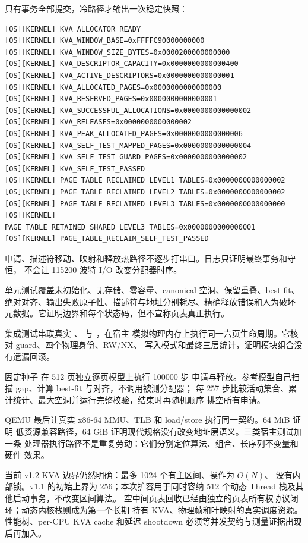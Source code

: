 只有事务全部提交，冷路径才输出一次稳定快照：

\begin{verbatim}
[OS][KERNEL] KVA_ALLOCATOR_READY
[OS][KERNEL] KVA_WINDOW_BASE=0xFFFFC90000000000
[OS][KERNEL] KVA_WINDOW_SIZE_BYTES=0x0000200000000000
[OS][KERNEL] KVA_DESCRIPTOR_CAPACITY=0x0000000000000400
[OS][KERNEL] KVA_ACTIVE_DESCRIPTORS=0x0000000000000001
[OS][KERNEL] KVA_ALLOCATED_PAGES=0x0000000000000000
[OS][KERNEL] KVA_RESERVED_PAGES=0x0000000000000001
[OS][KERNEL] KVA_SUCCESSFUL_ALLOCATIONS=0x0000000000000002
[OS][KERNEL] KVA_RELEASES=0x0000000000000002
[OS][KERNEL] KVA_PEAK_ALLOCATED_PAGES=0x0000000000000006
[OS][KERNEL] KVA_SELF_TEST_MAPPED_PAGES=0x0000000000000004
[OS][KERNEL] KVA_SELF_TEST_GUARD_PAGES=0x0000000000000002
[OS][KERNEL] KVA_SELF_TEST_PASSED
[OS][KERNEL] PAGE_TABLE_RECLAIMED_LEVEL1_TABLES=0x0000000000000002
[OS][KERNEL] PAGE_TABLE_RECLAIMED_LEVEL2_TABLES=0x0000000000000002
[OS][KERNEL] PAGE_TABLE_RECLAIMED_LEVEL3_TABLES=0x0000000000000000
[OS][KERNEL] PAGE_TABLE_RETAINED_SHARED_LEVEL3_TABLES=0x0000000000000001
[OS][KERNEL] PAGE_TABLE_RECLAIM_SELF_TEST_PASSED
\end{verbatim}

申请、描述符移动、映射和释放热路径不逐步打串口。日志只证明最终事务和守恒，
不会让 115200 波特 I/O 改变分配器时序。

单元测试覆盖未初始化、无存储、零容量、canonical 空洞、保留重叠、best-fit、
绝对对齐、输出失败原子性、描述符与地址分别耗尽、精确释放错误和人为破坏
元数据。它证明边界和每个状态码，但不宣称页表真正执行。

集成测试串联真实 、
 与 ，在宿主
模拟物理内存上执行同一六页生命周期。它核对 guard、四个物理身份、RW/NX、
写入模式和最终三层统计，证明模块组合没有遗漏回滚。

固定种子  在 512 页独立逐页模型上执行 100000 步
申请与释放。参考模型自己扫描 gap、计算 best-fit 与对齐，不调用被测分配器；
每 257 步比较活动集合、累计统计、最大空洞并运行完整校验，结束时再随机顺序
排空所有申请。

QEMU 最后让真实 x86-64 MMU、TLB 和 load/store 执行同一契约。64 MiB 证明
低资源兼容路径，64 GiB 证明现代规格没有改变地址层语义。三类宿主测试加一条
处理器执行路径不是重复劳动：它们分别定位算法、组合、长序列不变量和硬件
效果。

当前 v1.2 KVA 边界仍然明确：最多 1024 个有主区间、操作为 \(O(N)\)、
没有内部锁。v1.1 的初始上界为 256；本次扩容用于同时容纳 512 个动态
Thread 栈及其他启动事务，不改变区间算法。
空中间页表回收已经由独立的页表所有权协议闭环；动态内核栈则成为第一个长期
持有 KVA、物理帧和叶映射的真实调度资源。性能树、per-CPU KVA cache 和延迟
shootdown 必须等并发契约与测量证据出现后再加入。

